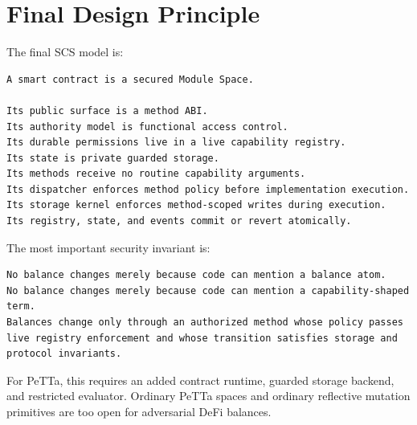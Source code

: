 \documentclass[11pt]{article}
\newcommand{\SCS}{\textsc{SCS}}
\newcommand{\PeTTa}{PeTTa}
\begin{document}
\section{Final Design Principle}

The final \SCS{} model is:

\begin{lstlisting}
A smart contract is a secured Module Space.

Its public surface is a method ABI.
Its authority model is functional access control.
Its durable permissions live in a live capability registry.
Its state is private guarded storage.
Its methods receive no routine capability arguments.
Its dispatcher enforces method policy before implementation execution.
Its storage kernel enforces method-scoped writes during execution.
Its registry, state, and events commit or revert atomically.
\end{lstlisting}

The most important security invariant is:

\begin{lstlisting}
No balance changes merely because code can mention a balance atom.
No balance changes merely because code can mention a capability-shaped term.
Balances change only through an authorized method whose policy passes live registry enforcement and whose transition satisfies storage and protocol invariants.
\end{lstlisting}

For \PeTTa{}, this requires an added contract runtime, guarded storage backend, and restricted evaluator. Ordinary \PeTTa{} spaces and ordinary reflective mutation primitives are too open for adversarial DeFi balances.
\end{document}
